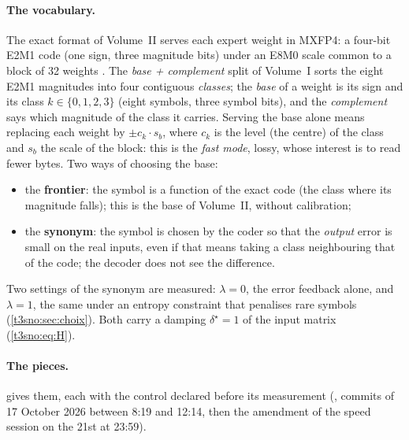 \paragraph{The vocabulary.} The exact format of Volume~II serves each expert weight in MXFP4: a four-bit E2M1 code (one sign, three magnitude bits) under an E8M0 scale common to a block of 32 weights \parencite{ocp_mx_v1}. The \emph{base + complement} split of Volume~I sorts the eight E2M1 magnitudes into four contiguous \emph{classes}; the \emph{base} of a weight is its sign and its class $k \in \{0,1,2,3\}$ (eight symbols, three symbol bits), and the \emph{complement} says which magnitude of the class it carries. Serving the base alone means replacing each weight by $\pm c_k \cdot s_b$, where $c_k$ is the level (the centre) of the class and $s_b$ the scale of the block: this is the \emph{fast mode}, lossy, whose interest is to read fewer bytes. Two ways of choosing the base:
\begin{itemize}
\item the \textbf{frontier}: the symbol is a function of the exact code (the class where its magnitude falls); this is the base of Volume~II, without calibration;
\item the \textbf{synonym}: the symbol is chosen by the coder so that the \emph{output} error is small on the real inputs, even if that means taking a class neighbouring that of the code; the decoder does not see the difference.
\end{itemize}
Two settings of the synonym are measured: $\lambda = 0$, the error feedback alone, and $\lambda = 1$, the same under an entropy constraint that penalises rare symbols (\cref{t3sno:sec:choix}). Both carry a damping $\delta^\star = 1$ of the input matrix (\cref{t3sno:eq:H}).

\paragraph{The pieces.}  gives them, each with the control declared before its measurement (, commits of 17 October 2026 between 8:19 and 12:14, then the amendment of the speed session on the 21st at 23:59).

